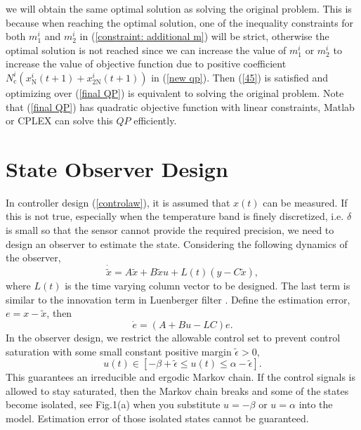 \documentclass[journal]{IEEEtran}
\begin{document}
we will obtain the same optimal solution as solving the original problem. This is because when reaching the optimal solution, one of the inequality constraints for both $m_{1}^{i}$ and $m_{2}^{i}$ in (\ref{constraint: additional m}) will be strict, otherwise the optimal solution is not reached since we can increase the value of $m_{1}^{i}$ or $m_{2}^{i}$ to increase the value of objective function due to positive coefficient $N_{\textrm{c}}^{i}(x_{\textrm{N}}^{i}(t+1)+x_{\textrm{2N}}^{i}(t+1))$ in (\ref{new qp}). Then (\ref{45}) is satisfied and optimizing over (\ref{final QP}) is equivalent to solving the original problem. Note that (\ref{final QP}) has quadratic objective function with linear constraints, Matlab or CPLEX can solve this $QP$ efficiently.

\section{State Observer Design}
\label{state observer design}
In controller design (\ref{controlaw}), it is assumed that $x(t)$ can be measured. If this is not true, especially when the temperature band is finely discretized, i.e. $\delta$ is small so that the sensor cannot provide the required precision, we need to design an observer to estimate the state. Considering the following dynamics of the observer,
\begin{equation}
\dot{\tilde{x}}=A\tilde{x}+B\tilde{x}u+L(t)(y-C\tilde{x}),
\end{equation}
where $L(t)$ is the time varying column vector to be designed. The last term is similar to the innovation term in Luenberger filter \cite{kalmanfilter}. Define the estimation error, $e=x-\tilde{x}$, then
\begin{equation}
\dot{e}=(A+Bu-LC)e.
\end{equation}
In the observer design, we restrict the allowable control set to prevent control saturation with some small constant positive margin $\tilde{\epsilon}>0$,
\begin{equation}
\label{allowable control set}
u(t)\in[-\beta+\tilde{\epsilon}\leq u(t)\leq \alpha-\tilde{\epsilon}].
\end{equation}
This guarantees an irreducible and ergodic Markov chain. If the control signals is allowed to stay saturated, then the Markov chain breaks and some of the states become isolated, see Fig.1(a) when you substitute $u=-\beta$ or $u=\alpha$ into the model. Estimation error of those isolated states cannot be guaranteed. 
\end{document}

